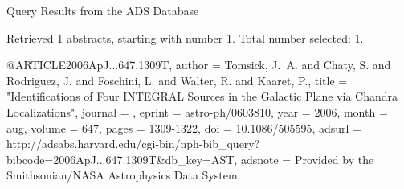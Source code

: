 Query Results from the ADS Database


Retrieved 1 abstracts, starting with number 1.  Total number selected: 1.

@ARTICLE{2006ApJ...647.1309T,
   author = {{Tomsick}, J.~A. and {Chaty}, S. and {Rodriguez}, J. and {Foschini}, L. and 
	{Walter}, R. and {Kaaret}, P.},
    title = "{Identifications of Four INTEGRAL Sources in the Galactic Plane via Chandra Localizations}",
  journal = {\apj},
   eprint = {astro-ph/0603810},
     year = 2006,
    month = aug,
   volume = 647,
    pages = {1309-1322},
      doi = {10.1086/505595},
   adsurl = {http://adsabs.harvard.edu/cgi-bin/nph-bib_query?bibcode=2006ApJ...647.1309T&db_key=AST},
  adsnote = {Provided by the Smithsonian/NASA Astrophysics Data System}
}


